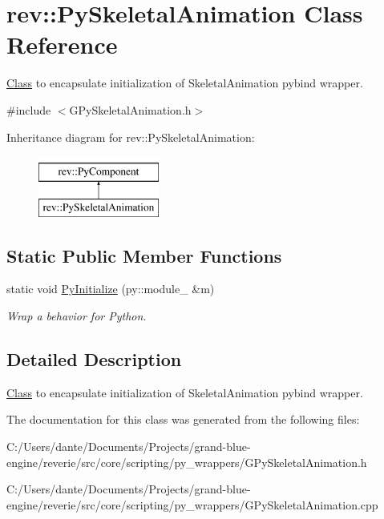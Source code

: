 \hypertarget{classrev_1_1_py_skeletal_animation}{}\section{rev\+::Py\+Skeletal\+Animation Class Reference}
\label{classrev_1_1_py_skeletal_animation}


\mbox{\hyperlink{struct_class}{Class}} to encapsulate initialization of Skeletal\+Animation pybind wrapper.  




{\ttfamily \#include $<$G\+Py\+Skeletal\+Animation.\+h$>$}

Inheritance diagram for rev\+::Py\+Skeletal\+Animation\+:\begin{figure}[H]
\begin{center}
\leavevmode
\includegraphics[height=2.000000cm]{classrev_1_1_py_skeletal_animation}
\end{center}
\end{figure}
\subsection*{Static Public Member Functions}
\begin{DoxyCompactItemize}
\item 
\mbox{\label{classrev_1_1_py_skeletal_animation_acc85f4185900ae1f623d95ad99042887}} 
static void \mbox{\hyperlink{classrev_1_1_py_skeletal_animation_acc85f4185900ae1f623d95ad99042887}{Py\+Initialize}} (py\+::module\+\_\+ \&m)
\begin{DoxyCompactList}\small\item\em Wrap a behavior for Python. \end{DoxyCompactList}\end{DoxyCompactItemize}


\subsection{Detailed Description}
\mbox{\hyperlink{struct_class}{Class}} to encapsulate initialization of Skeletal\+Animation pybind wrapper. 

The documentation for this class was generated from the following files\+:\begin{DoxyCompactItemize}
\item 
C\+:/\+Users/dante/\+Documents/\+Projects/grand-\/blue-\/engine/reverie/src/core/scripting/py\+\_\+wrappers/G\+Py\+Skeletal\+Animation.\+h\item 
C\+:/\+Users/dante/\+Documents/\+Projects/grand-\/blue-\/engine/reverie/src/core/scripting/py\+\_\+wrappers/G\+Py\+Skeletal\+Animation.\+cpp\end{DoxyCompactItemize}
